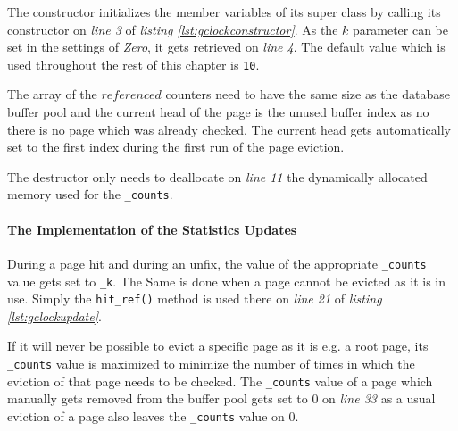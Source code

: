     The constructor initializes the member variables of its super class by calling its constructor on \emph{line 3} of \emph{listing \ref{lst:gclockconstructor}}. As the $k$ parameter can be set in the settings of \textit{Zero}, it gets retrieved on \emph{line 4}. The default value which is used throughout the rest of this chapter is \lstinline{10}.

    The array of the $referenced$ counters need to have the same size as the database buffer pool and the current head of the page is the unused buffer index as no there is no page which was already checked. The current head gets automatically set to the first index during the first run of the page eviction.

    The destructor only needs to deallocate on \emph{line 11} the dynamically allocated memory used for the \lstinline{_counts}.

\paragraph{The Implementation of the Statistics Updates}

\begin{@empty}
    \lstset{
        language = [ISO]C++,
        style = basic
    }
    \begin{code}[ht!]
        \caption{Implementation of \lstinline{page_evictioner_gclock::hit_ref()}, \lstinline{used_ref()}, \lstinline{block_ref()} and \lstinline{unbuffered()}} \label{lst:gclockupdate}
        
    \end{code}
\end{@empty}

    During a page hit and during an unfix, the value of the appropriate \lstinline{_counts} value gets set to \lstinline{_k}. The Same is done when a page cannot be evicted as it is in use. Simply the \lstinline{hit_ref()} method is used there on \emph{line 21} of \emph{listing \ref{lst:gclockupdate}}.

    If it will never be possible to evict a specific page as it is e.g. a root page, its \lstinline{_counts} value is maximized to minimize the number of times in which the eviction of that page needs to be checked. The \lstinline{_counts} value of a page which manually gets removed from the buffer pool gets set to $0$ on \emph{line 33} as a usual eviction of a page also leaves the \lstinline{_counts} value on $0$.

